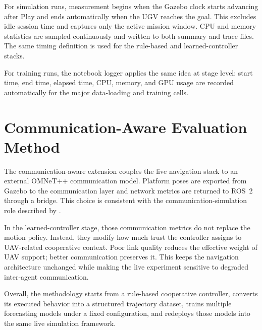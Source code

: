 For simulation runs, measurement begins when the Gazebo clock starts advancing after Play and ends automatically when the UGV reaches the goal. This excludes idle session time and captures only the active mission window. CPU and memory statistics are sampled continuously and written to both summary and trace files. The same timing definition is used for the rule-based and learned-controller stacks.

For training runs, the notebook logger applies the same idea at stage level: start time, end time, elapsed time, CPU, memory, and GPU usage are recorded automatically for the major data-loading and training cells.

\section{Communication-Aware Evaluation Method}

The communication-aware extension couples the live navigation stack to an external OMNeT++ communication model. Platform poses are exported from Gazebo to the communication layer and network metrics are returned to ROS~2 through a bridge. This choice is consistent with the communication-simulation role described by \citeauthor{varga2008omnet} \citep{varga2008omnet}.

In the learned-controller stage, those communication metrics do not replace the motion policy. Instead, they modify how much trust the controller assigns to UAV-related cooperative context. Poor link quality reduces the effective weight of UAV support; better communication preserves it. This keeps the navigation architecture unchanged while making the live experiment sensitive to degraded inter-agent communication.

Overall, the methodology starts from a rule-based cooperative controller, converts its executed behavior into a structured trajectory dataset, trains multiple forecasting models under a fixed configuration, and redeploys those models into the same live simulation framework.
